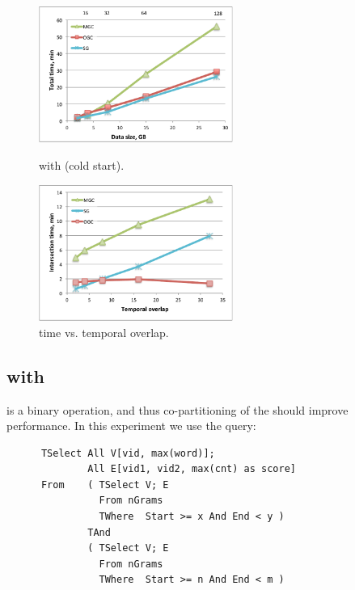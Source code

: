 \begin{figure}
\centering
\begin{minipage}{3in}
  \centering
  \includegraphics[width=2.5in]{figs/tgroupe_cold.pdf}
\vspace{-0.1in}
  \caption{ with  (cold start).}
\label{fig:tgroupe_cold}
\vspace{-0.1in}
\end{minipage}
\begin{minipage}{3in}
  \centering
\includegraphics[width=2.5in]{figs/tand_all_warm.pdf}
\vspace{-0.1in}
\caption{ time vs. temporal overlap.}
\label{fig:tandall}
\vspace{-0.1in}
\end{minipage}
\end{figure}

\subsection{ with }

 is a binary operation, and thus co-partitioning of the
\tgs should improve performance.  In this experiment we use the query:

\begin{small}
\begin{verbatim}
      TSelect All V[vid, max(word)];
              All E[vid1, vid2, max(cnt) as score]
      From    ( TSelect V; E
                From nGrams
                TWhere  Start >= x And End < y )
              TAnd
              ( TSelect V; E
                From nGrams
                TWhere  Start >= n And End < m )      
\end{verbatim}
\end{small}

